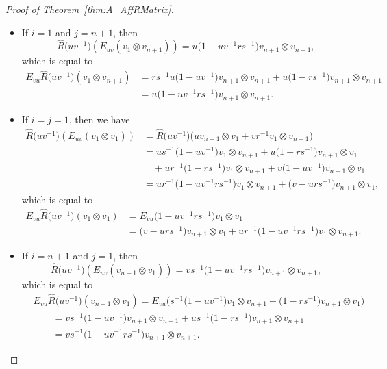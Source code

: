\documentclass[pdftex]{sigma}
\numberwithin{equation}{section}
\begin{document}
\begin{proof}[Proof of Theorem~\ref{thm:A_AffRMatrix}]
\begin{itemize}
\item
If $i = 1$ and $j = n+ 1$, then
\begin{displaymath}
 \hat{R}\bigl(uv^{-1}\bigr)(E_{uv}(v_{1} \otimes v_{n+1})) = u\bigl(1 - uv^{-1}rs^{-1}\bigr)v_{n+ 1} \otimes v_{n+ 1},
\end{displaymath}
which is equal to
\begin{displaymath}
\begin{split}
 E_{vu}\hat{R}\bigl(uv^{-1}\bigr)(v_{1} \otimes v_{n+1}) &=
 rs^{-1}u\bigl(1 - uv^{-1}\bigr)v_{n+1} \otimes v_{n + 1} + u\bigl(1 - rs^{-1}\bigr)v_{n +1} \otimes v_{n+1} \\
 &= u\bigl(1 - uv^{-1}rs^{-1}\bigr)v_{n+1} \otimes v_{n+1}.
\end{split}
\end{displaymath}

\item
If $i = j = 1$, then we have
\begin{displaymath}
\begin{split}
 \hat{R}\bigl(uv^{-1}\bigr)(E_{uv}(v_{1} \otimes v_{1})) &{}=
 \hat{R}\bigl(uv^{-1}\bigr)\bigl(uv_{n+1} \otimes v_{1} + vr^{-1}v_{1} \otimes v_{n+1}\bigr) \\
 & = us^{-1}\bigl(1 - uv^{-1}\bigr)v_{1} \otimes v_{n+1} + u\bigl(1 - rs^{-1}\bigr)v_{n+1} \otimes v_{1} \\
 &\quad{}+ ur^{-1}\bigl(1 - rs^{-1}\bigr)v_{1} \otimes v_{n+1} + v\bigl(1 - uv^{-1}\bigr) v_{n+1} \otimes v_{1} \\
 & = ur^{-1}\bigl(1 - uv^{-1}rs^{-1}\bigr)v_{1} \otimes v_{n+1} + \bigl(v - urs^{-1}\bigr)v_{n+1} \otimes v_{1},
\end{split}
\end{displaymath}
which is equal to
\begin{displaymath}
\begin{split}
 E_{vu}\hat{R}\bigl(uv^{-1}\bigr)(v_{1} \otimes v_{1}) &=
 E_{vu}\bigl(1 - uv^{-1}rs^{-1}\bigr)v_{1} \otimes v_{1} \\
 &= \bigl(v - urs^{-1}\bigr)v_{n+1} \otimes v_{1} + ur^{-1}\bigl(1 - uv^{-1}rs^{-1}\bigr)v_{1} \otimes v_{n+1}.
\end{split}
\end{displaymath}

\item
If $i = n + 1$ and $j = 1$, then
\begin{displaymath}
 \hat{R}\bigl(uv^{-1}\bigr)(E_{uv}(v_{n+ 1} \otimes v_{1})) = vs^{-1}\bigl(1 - uv^{-1}rs^{-1}\bigr)v_{n+1} \otimes v_{n+1},
\end{displaymath}
which is equal to
\begin{align*}
 &E_{vu}\hat{R}\bigl(uv^{-1}\bigr)(v_{n+1} \otimes v_{1})
= E_{vu}\bigl(s^{-1}\bigl(1 - uv^{-1}\bigr)v_{1} \otimes v_{n+1} + \bigl(1 - rs^{-1}\bigr)v_{n+1} \otimes v_{1}\bigr) \\
 &\qquad{}= vs^{-1}\bigl(1 - uv^{-1}\bigr)v_{n+1} \otimes v_{n+1} + us^{-1}\bigl(1 - rs^{-1}\bigr)v_{n + 1} \otimes v_{n+1} \\
 &\qquad{}= vs^{-1}\bigl(1 - uv^{-1}rs^{-1}\bigr)v_{n + 1} \otimes v_{n+1}.
\end{align*}


\end{itemize}
\end{proof}
\end{document}

